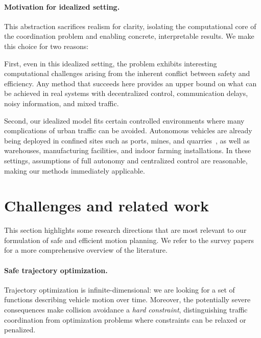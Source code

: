 \documentclass{report}
\theoremstyle{definition}
\theoremstyle{plain}
\begin{document}
\paragraph{Motivation for idealized setting.}

This abstraction sacrifices realism for clarity, isolating the computational
core of the coordination problem and enabling concrete, interpretable results.
We make this choice for two reasons:

First, even in this idealized setting, the problem exhibits interesting
computational challenges arising from the inherent conflict between safety and
efficiency.
%
Any method that succeeds here provides an upper bound on what can be
achieved in real systems with decentralized control, communication delays, noisy
information, and mixed traffic.

Second, our idealized model fits certain controlled environments where many
complications of urban traffic can be avoided. Autonomous vehicles are already
being deployed in confined sites such as ports, mines, and
quarries~\cite{kojchevOptimizationBasedCoordination2024}, as well as warehouses,
manufacturing facilities, and indoor farming installations. In these settings,
assumptions of full autonomy and centralized control are reasonable, making our
methods immediately applicable.


\section{Challenges and related work}


This section highlights some research directions that are most
relevant to our formulation of safe and efficient motion planning.
%
We refer to the survey
papers~\cite{marianiCoordinationAutonomousVehicles2022,khayatianSurveyIntersectionManagement2020}
for a more comprehensive overview of the literature.

\paragraph{Safe trajectory optimization.}
Trajectory optimization is infinite-dimensional: we are looking for a set of
functions describing vehicle motion over time. Moreover, the potentially severe
consequences make collision avoidance a \emph{hard constraint}, distinguishing
traffic coordination from optimization problems where constraints can be relaxed
or penalized.
\end{document}
